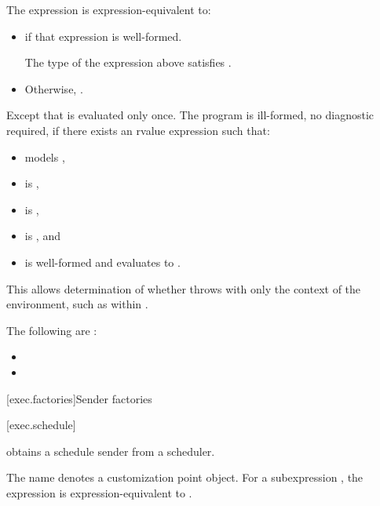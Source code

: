 \pnum
The expression  is expression-equivalent to:
\begin{itemize}
\item
{} if that expression is well-formed.

\mandates
The type of the expression above satisfies .

\item
Otherwise, .
\end{itemize}
Except that  is evaluated only once.
The program is ill-formed, no diagnostic required,
if there exists an rvalue expression  such that:
\begin{itemize}
\item {} models ,
\item {} is ,
\item {} is ,
\item {} is , and
\item {}
is well-formed and evaluates to .
\end{itemize}
\begin{note}
This allows determination of whether  throws
with only the context of the environment,
such as within .
\end{note}

\mandates
The following are :
\begin{itemize}
\item
{}
\item
{}
\end{itemize}

[exec.factories]{Sender factories}

[exec.schedule]{}

\pnum
{} obtains a schedule sender
from a scheduler.

\pnum
The name  denotes a customization point object.
For a subexpression ,
the expression  is expression-equivalent to
.

